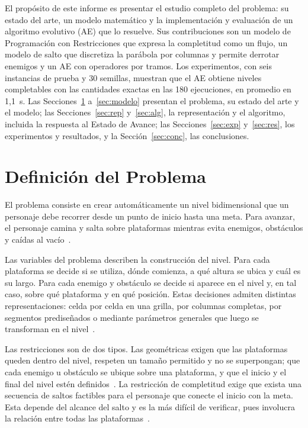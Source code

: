 \documentclass[letter, 10pt]{article}
\begin{document}
El prop\'osito de este informe es presentar el estudio completo del problema: su estado del arte, un modelo matem\'atico y la implementaci\'on y evaluaci\'on de un algoritmo evolutivo (AE) que lo resuelve. Sus contribuciones son un modelo de Programaci\'on con Restricciones que expresa la completitud como un flujo, un modelo de salto que discretiza la par\'abola por columnas y permite derrotar enemigos y un AE con operadores por tramos. Los experimentos, con seis instancias de prueba y 30 semillas, muestran que el AE obtiene niveles completables con las cantidades exactas en las 180 ejecuciones, en promedio en 1,1~s. Las Secciones~\ref{sec:def} a~\ref{sec:modelo} presentan el problema, su estado del arte y el modelo; las Secciones~\ref{sec:rep} y~\ref{sec:alg}, la representaci\'on y el algoritmo, incluida la respuesta al Estado de Avance; las Secciones~\ref{sec:exp} y~\ref{sec:res}, los experimentos y resultados, y la Secci\'on~\ref{sec:conc}, las conclusiones.

\section{Definici\'on del Problema}
\label{sec:def}

El problema consiste en crear autom\'aticamente un nivel bidimensional que un personaje debe recorrer desde un punto de inicio hasta una meta. Para avanzar, el personaje camina y salta sobre plataformas mientras evita enemigos, obst\'aculos y ca\'idas al vac\'io~\cite{Compton2006, Saavedra2026}.

Las variables del problema describen la construcci\'on del nivel. Para cada plataforma se decide si se utiliza, d\'onde comienza, a qu\'e altura se ubica y cu\'al es su largo. Para cada enemigo y obst\'aculo se decide si aparece en el nivel y, en tal caso, sobre qu\'e plataforma y en qu\'e posici\'on. Estas decisiones admiten distintas representaciones: celda por celda en una grilla, por columnas completas, por segmentos predise\~nados o mediante par\'ametros generales que luego se transforman en el nivel~\cite{Togelius2011, Dahlskog2013, DePontes2022}.

Las restricciones son de dos tipos. Las geom\'etricas exigen que las plataformas queden dentro del nivel, respeten un tama\~no permitido y no se superpongan; que cada enemigo u obst\'aculo se ubique sobre una plataforma, y que el inicio y el final del nivel est\'en definidos~\cite{Saavedra2026}. La restricci\'on de completitud exige que exista una secuencia de saltos factibles para el personaje que conecte el inicio con la meta. Esta depende del alcance del salto y es la m\'as dif\'icil de verificar, pues involucra la relaci\'on entre todas las plataformas~\cite{Compton2006, Smith2011}.
\end{document}
